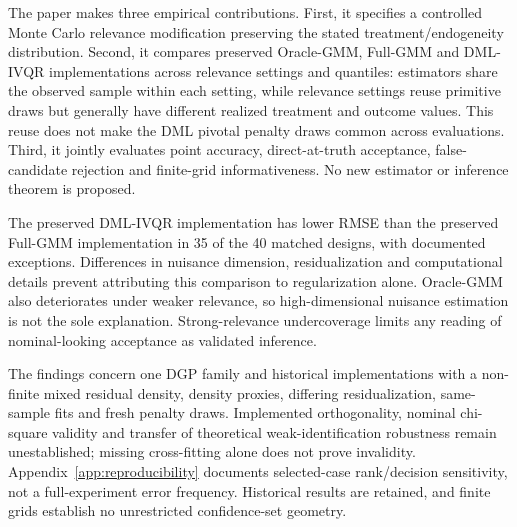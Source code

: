 The paper makes three empirical contributions. First, it specifies a controlled Monte Carlo relevance modification preserving the stated treatment/endogeneity distribution. Second, it compares preserved Oracle-GMM, Full-GMM and DML-IVQR implementations across relevance settings and quantiles: estimators share the observed sample within each setting, while relevance settings reuse primitive draws but generally have different realized treatment and outcome values. This reuse does not make the DML pivotal penalty draws common across evaluations. Third, it jointly evaluates point accuracy, direct-at-truth acceptance, false-candidate rejection and finite-grid informativeness. No new estimator or inference theorem is proposed.

The preserved DML-IVQR implementation has lower RMSE than the preserved Full-GMM implementation in 35 of the 40 matched designs, with documented exceptions. Differences in nuisance dimension, residualization and computational details prevent attributing this comparison to regularization alone. Oracle-GMM also deteriorates under weaker relevance, so high-dimensional nuisance estimation is not the sole explanation. Strong-relevance undercoverage limits any reading of nominal-looking acceptance as validated inference.

The findings concern one DGP family and historical implementations with a non-finite mixed residual density, density proxies, differing residualization, same-sample fits and fresh penalty draws. Implemented orthogonality, nominal chi-square validity and transfer of theoretical weak-identification robustness remain unestablished; missing cross-fitting alone does not prove invalidity. Appendix~\ref{app:reproducibility} documents selected-case rank/decision sensitivity, not a full-experiment error frequency. Historical results are retained, and finite grids establish no unrestricted confidence-set geometry.
